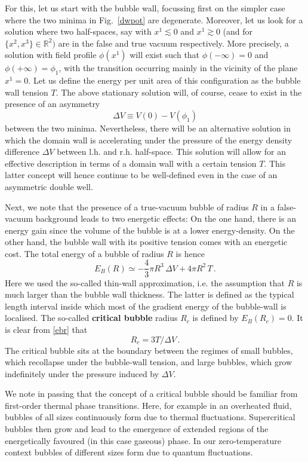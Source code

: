 \documentclass[12pt]{article}
\newcommand{\be}{\begin{equation}}
\newcommand{\ee}{\end{equation}}
\numberwithin{equation}{section}
\begin{document}
For this, let us start with the bubble wall, focussing first on the simpler case where the two minima in Fig.~\ref{dwpot} are degenerate. Moreover, let us look for a solution where two half-spaces, say with $x^1\lesssim 0$ and $x^1\gtrsim 0$ (and for $\{x^2,x^3\}\in \mathbb{R}^2)$ are in the false and true vacuum respectively. More precisely, a solution with field profile $\phi(x^1)$ will exist such that $\phi(-\infty)=0$ and $\phi(+\infty)=\phi_1$, with the transition occurring mainly in the vicinity of the plane $x^1=0$. Let us define the energy per unit area of this configuration as the bubble wall tension $T$. The above stationary solution will, of course, cease to exist in the presence of an asymmetry 
\be
\Delta V\equiv V(0)-V(\phi_1)
\ee
between the two minima. Nevertheless, there will be an alternative solution in which the domain wall is accelerating  under the pressure of the energy density difference $\Delta V$ between l.h. and r.h. half-space. This solution will allow for an effective description in terms of a domain wall with a certain tension $T$. This latter concept will hence continue to be well-defined even in the case of an asymmetric double well.

Next, we note that the presence of a true-vacuum bubble of radius $R$ in a false-vacuum background leads to two energetic effects: On the one hand, there is an energy gain since the volume of the bubble is at a lower energy-density. On the other hand, the bubble wall with its positive tension comes with an energetic cost. The total energy of a bubble of radius $R$ is hence
\be
E_B(R)\simeq -\frac{4}{3}\pi R^3\,\Delta V + 4 \pi R^2\,T\,.
\label{ebr}
\ee
Here we used the so-called thin-wall approximation, i.e. the assumption that $R$ is much larger than the bubble wall thickness. The latter is defined as the typical length interval inside which most of the gradient energy of the bubble-wall is localised. The so-called {\bf critical bubble} radius  $R_c$ is defined by $E_B(R_c)=0$. It is clear from \eqref{ebr} that
\be
R_c=3 T/\Delta V\,.\label{rc}
\ee
The critical bubble sits at the boundary between the regimes of small bubbles, which recollapse under the bubble-wall tension, and large bubbles, which grow indefinitely under the pressure induced by $\Delta V$. 

We note in passing that the concept of a critical bubble should be familiar from first-order thermal phase transitions. Here, for example in an overheated fluid, bubbles of all sizes continuously form due to thermal fluctuations. Supercritical bubbles then grow and lead to the emergence of extended regions of the energetically favoured (in this case gaseous) phase. In our zero-temperature context bubbles of different sizes form due to quantum fluctuations.
\end{document}
